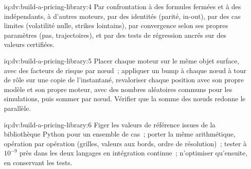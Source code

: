 \begin{solution}{iq:dv:build-a-pricing-library:4}
Par confrontation à des formules fermées et à des  indépendants, à d'autres moteurs, par des identités (parité, in-out), par des cas limites (volatilité nulle, strikes lointains), par convergence
selon ses propres paramètres (pas, trajectoires), et par des tests de régression ancrés sur des valeurs certifiées.
\end{solution}

\begin{solution}{iq:dv:build-a-pricing-library:5}
Placer chaque moteur sur le même objet surface, avec des facteurs de risque par nœud~; appliquer un bump à chaque nœud à tour de rôle sur une copie de l'instantané, revaloriser chaque position
avec son propre modèle et son propre moteur, avec des nombres aléatoires communs pour les simulations, puis sommer par nœud. Vérifier que la somme des nœuds redonne le  parallèle.
\end{solution}

\begin{solution}{iq:dv:build-a-pricing-library:6}
Figer les valeurs de référence issues de la bibliothèque Python pour un ensemble de cas~; porter la même arithmétique, opération par opération (grilles, valeurs aux bords, ordre de résolution)~; tester
à $10^{-9}$ près dans les deux langages en intégration continue~; n'optimiser qu'ensuite, en conservant les tests.
\end{solution}
